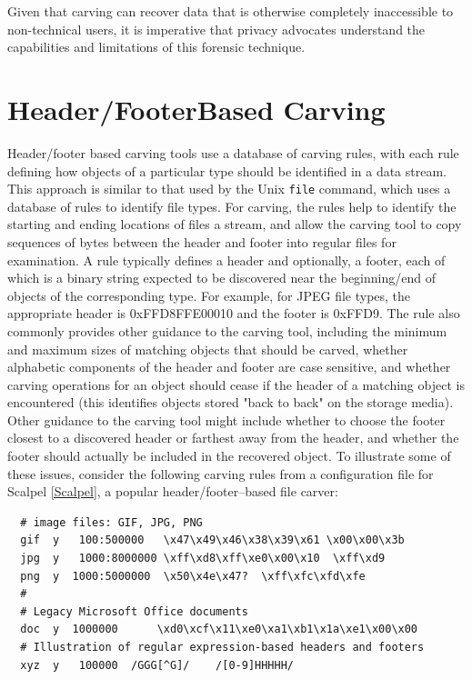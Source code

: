 Given that carving can recover data that is otherwise completely inaccessible to non-technical users, it is imperative that privacy advocates understand the capabilities and limitations of this forensic technique.  


\section{Header/Footer\-Based Carving}

Header/footer based carving tools use a database of carving rules, with each rule defining how objects of a particular type should be identified in a data stream. This approach is similar to that used by the Unix {\tt file} command, which uses a database of rules to identify file types.  For carving, the rules help to identify the starting and ending locations of files a stream, and allow the carving tool to copy sequences of bytes between the header and footer into regular files for examination.  A rule typically defines a header and optionally, a footer, each of which is a binary string expected to be discovered near the beginning/end of objects of the corresponding type.  For example, for JPEG file types, the appropriate header is 0xFFD8FFE00010 and the footer is 0xFFD9.  The rule also commonly provides other guidance to the carving tool, including the minimum and maximum sizes of matching objects that should be carved, whether alphabetic components of the header and footer are case sensitive, and whether carving operations for an object should cease if the header of a matching object is encountered (this identifies objects stored "back to back" on the storage media).  Other guidance to the carving tool might include whether to choose the footer closest to a discovered header or farthest away from the header, and whether the footer should actually be included in the recovered object.  To illustrate some of these issues, consider the following carving rules from a configuration file for Scalpel \ref{Scalpel}, a popular header/footer--based file carver:

{
\begin{Verbatim}
  # image files: GIF, JPG, PNG
  gif  y   100:500000   \x47\x49\x46\x38\x39\x61 \x00\x00\x3b
  jpg  y   1000:8000000 \xff\xd8\xff\xe0\x00\x10  \xff\xd9
  png  y  1000:5000000  \x50\x4e\x47?  \xff\xfc\xfd\xfe
  #
  # Legacy Microsoft Office documents
  doc  y  1000000      \xd0\xcf\x11\xe0\xa1\xb1\x1a\xe1\x00\x00 
  # Illustration of regular expression-based headers and footers
  xyz  y   100000  /GGG[^G]/    /[0-9]HHHHH/
\end{Verbatim}
}

